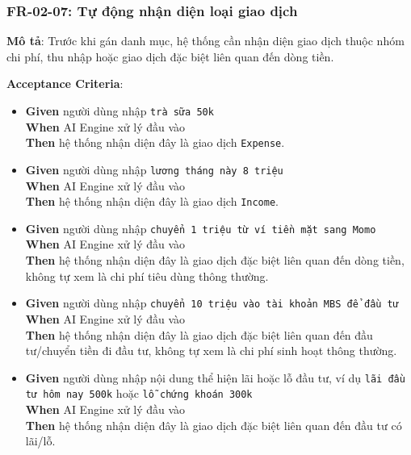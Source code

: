 \subsubsection{FR-02-07: Tự động nhận diện loại giao dịch}

\textbf{Mô tả}: Trước khi gán danh mục, hệ thống cần nhận diện giao dịch thuộc nhóm chi phí, thu nhập hoặc giao dịch đặc biệt liên quan đến dòng tiền.



\textbf{Acceptance Criteria}:

\begin{itemize}
\item \textbf{Given} người dùng nhập \texttt{trà sữa 50k}  \\ \hspace*{1.5em}  \textbf{When} AI Engine xử lý đầu vào  \\ \hspace*{1.5em}  \textbf{Then} hệ thống nhận diện đây là giao dịch \texttt{Expense}.
\item \textbf{Given} người dùng nhập \texttt{lương tháng này 8 triệu}  \\ \hspace*{1.5em}  \textbf{When} AI Engine xử lý đầu vào  \\ \hspace*{1.5em}  \textbf{Then} hệ thống nhận diện đây là giao dịch \texttt{Income}.
\item \textbf{Given} người dùng nhập \texttt{chuyển 1 triệu từ ví tiền mặt sang Momo}  \\ \hspace*{1.5em}  \textbf{When} AI Engine xử lý đầu vào  \\ \hspace*{1.5em}  \textbf{Then} hệ thống nhận diện đây là giao dịch đặc biệt liên quan đến dòng tiền, không tự xem là chi phí tiêu dùng thông thường.
\item \textbf{Given} người dùng nhập \texttt{chuyển 10 triệu vào tài khoản MBS để đầu tư}  \\ \hspace*{1.5em}  \textbf{When} AI Engine xử lý đầu vào  \\ \hspace*{1.5em}  \textbf{Then} hệ thống nhận diện đây là giao dịch đặc biệt liên quan đến đầu tư/chuyển tiền đi đầu tư, không tự xem là chi phí sinh hoạt thông thường.
\item \textbf{Given} người dùng nhập nội dung thể hiện lãi hoặc lỗ đầu tư, ví dụ \texttt{lãi đầu tư hôm nay 500k} hoặc \texttt{lỗ chứng khoán 300k}  \\ \hspace*{1.5em}  \textbf{When} AI Engine xử lý đầu vào  \\ \hspace*{1.5em}  \textbf{Then} hệ thống nhận diện đây là giao dịch đặc biệt liên quan đến đầu tư có lãi/lỗ.

\end{itemize}
